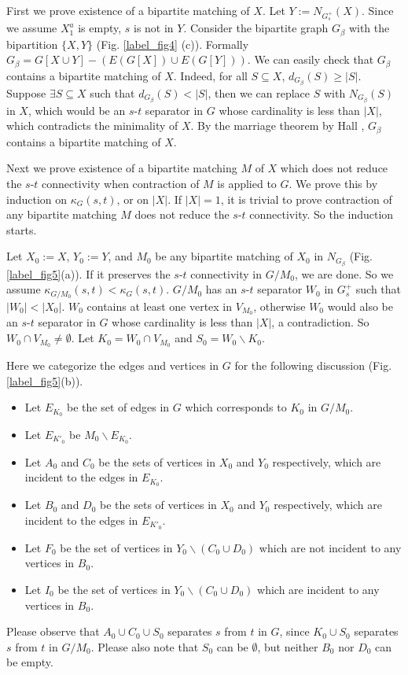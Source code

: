\documentclass{article}
\begin{document}
First we prove existence of a bipartite matching of $X$.
Let $Y := N_{G_s^+}(X)$. Since we assume $X_1^a$ is empty, $s$ is not in $Y$.
Consider the bipartite graph $G_\beta$ with the bipartition $\{X, Y\}$ (Fig. \ref{label_fig4} (c)).
Formally $G_\beta = G[X\cup Y] - \left(E\left(G[X]\right)\cup E\left(G[Y]\right)\right)$.
We can easily check that $G_\beta$ contains a bipartite matching of $X$.
Indeed, for all $S\subseteq X$, $d_{G_\beta}(S)\ge|S|$.
Suppose $\exists S \subseteq X$ such that $d_{G_\beta}(S) < |S|$, then
we can replace $S$ with $N_{G_\beta}(S)$ in $X$, which would be an $s$-$t$ separator in $G$
whose cardinality is less than $|X|$, which contradicts the minimality of $X$.
By the marriage theorem by Hall \cite{hall1}, $G_\beta$ contains a bipartite matching of $X$.

Next we prove existence of a bipartite matching $M$ of $X$ which does not reduce the $s$-$t$ connectivity
when contraction of $M$ is applied to $G$.
We prove this by induction on $\kappa_G(s, t)$, or on $|X|$.
If $|X| = 1$, it is trivial to prove contraction of any bipartite matching $M$ does not reduce
the $s$-$t$ connectivity. So the induction starts.

Let $X_0 := X$, $Y_0 := Y$, and $M_0$ be any bipartite matching of $X_0$ in $N_{G_\beta}$ (Fig. \ref{label_fig5}(a)).
 If it preserves the $s$-$t$ connectivity in $G/M_0$, we are done.
So we assume $\kappa_{G/M_0}(s, t) < \kappa_{G}(s, t)$.
$G/{M_0}$ has an $s$-$t$ separator $W_0$ in $G_s^+$ such that
$|W_0| < |X_0|$. $W_0$ contains at least one vertex in $V_{M_0}$,
otherwise $W_0$ would also be an $s$-$t$ separator in $G$ whose cardinality is less than $|X|$, a contradiction.
So $W_0\cap V_{M_0}\ne \emptyset$. Let $K_0 = W_0\cap V_{M_0}$ and $S_0 = W_0 \backslash K_0$.

Here we categorize the edges and vertices in $G$ for the following discussion (Fig. \ref{label_fig5}(b)).
\begin{itemize}
\item Let $E_{K_0}$ be the set of edges in $G$ which corresponds to $K_0$ in $G/M_0$.
\item Let $E_{K'_0}$ be $M_0\backslash E_{K_0}$.
\item Let $A_0$ and $C_0$ be the sets of vertices in $X_0$ and $Y_0$ respectively,
which are incident to the edges in $E_{K_0}$.
\item Let $B_0$ and $D_0$ be the sets of vertices in $X_0$ and $Y_0$ respectively, 
which are incident to the edges in $E_{K'_0}$.
\item Let $F_0$ be the set of vertices in $Y_0\backslash (C_0\cup D_0)$ which are not incident to any vertices in $B_0$.
\item Let $I_0$ be the set of vertices in $Y_0\backslash (C_0\cup D_0)$ which are incident to any vertices in $B_0$.
\end{itemize}
Please observe that $A_0 \cup C_0 \cup S_0$ separates $s$ from $t$ in $G$,
since $K_0 \cup S_0$ separates $s$ from $t$ in $G/M_0$.
Please also note that $S_0$ can be $\emptyset$, but neither $B_0$ nor $D_0$ can be empty.
\end{document}
